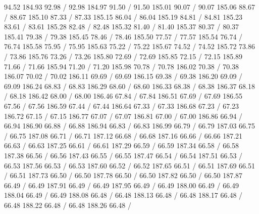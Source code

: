 { 94.52 184.93 92.98 /
 92.98 184.97 91.50 /
 91.50 185.01 90.07 /
 90.07 185.06 88.67 /
 88.67 185.10 87.33 /
 87.33 185.15 86.04 /
 86.04 185.19 84.81 /
 84.81 185.23 83.61 /
 83.61 185.28 82.48 /
 82.48 185.32 81.40 /
 81.40 185.37 80.37 /
 80.37 185.41 79.38 /
 79.38 185.45 78.46 /
 78.46 185.50 77.57 /
 77.57 185.54 76.74 /
 76.74 185.58 75.95 /
 75.95 185.63 75.22 /
 75.22 185.67 74.52 /
 74.52 185.72 73.86 /
 73.86 185.76 73.26 /
 73.26 185.80 72.69 /
 72.69 185.85 72.15 /
 72.15 185.89 71.66 /
 71.66 185.94 71.20 /
 71.20 185.98 70.78 /
 70.78 186.02 70.38 /
 70.38 186.07 70.02 /
 70.02 186.11 69.69 /
 69.69 186.15 69.38 /
 69.38 186.20 69.09 /
 69.09 186.24 68.83 /
 68.83 186.29 68.60 /
 68.60 186.33 68.38 /
 68.38 186.37 68.18 /
 68.18 186.42 68.00 /
 68.00 186.46 67.84 /
 67.84 186.51 67.69 /
 67.69 186.55 67.56 /
 67.56 186.59 67.44 /
 67.44 186.64 67.33 /
 67.33 186.68 67.23 /
 67.23 186.72 67.15 /
 67.15 186.77 67.07 /
 67.07 186.81 67.00 /
 67.00 186.86 66.94 /
 66.94 186.90 66.88 /
 66.88 186.94 66.83 /
 66.83 186.99 66.79 /
 66.79 187.03 66.75 /
 66.75 187.08 66.71 /
 66.71 187.12 66.68 /
 66.68 187.16 66.66 /
 66.66 187.21 66.63 /
 66.63 187.25 66.61 /
 66.61 187.29 66.59 /
 66.59 187.34 66.58 /
 66.58 187.38 66.56 /
 66.56 187.43 66.55 /
 66.55 187.47 66.54 /
 66.54 187.51 66.53 /
 66.53 187.56 66.53 /
 66.53 187.60 66.52 /
 66.52 187.65 66.51 /
 66.51 187.69 66.51 /
 66.51 187.73 66.50 /
 66.50 187.78 66.50 /
 66.50 187.82 66.50 /
 66.50 187.87 66.49 /
 66.49 187.91 66.49 /
 66.49 187.95 66.49 /
 66.49 188.00 66.49 /
 66.49 188.04 66.49 /
 66.49 188.08 66.48 /
 66.48 188.13 66.48 /
 66.48 188.17 66.48 /
 66.48 188.22 66.48 /
 66.48 188.26 66.48 /
}
